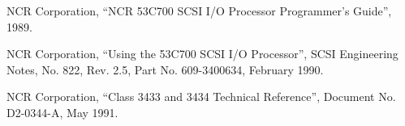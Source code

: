 \begin{thebibliography}{99}
NCR Corporation,
``NCR 53C700 SCSI I/O Processor Programmer's Guide'',
1989.

NCR Corporation,
``Using the 53C700 SCSI I/O Processor'',
SCSI Engineering Notes, No. 822, Rev. 2.5,
Part No. 609-3400634, February 1990.


NCR Corporation,
``Class 3433 and 3434 Technical Reference'',
Document No. D2-0344-A, May 1991.











\end{thebibliography}

